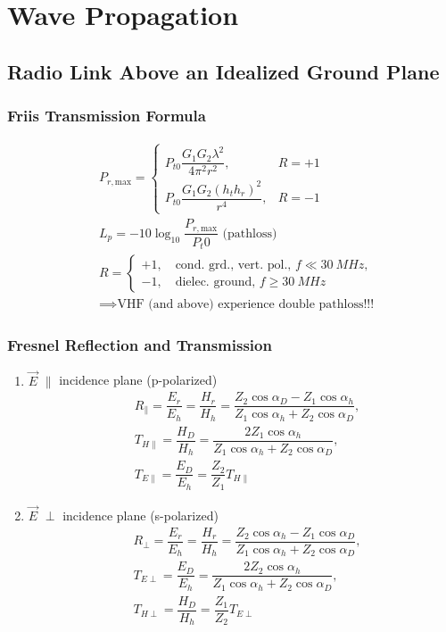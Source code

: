 \section{Wave Propagation}
\subsection{Radio Link Above an Idealized Ground Plane}
\subsubsection{Friis Transmission Formula}

\begin{align*}
    &P_{r,\mathrm{max}} =
    \begin{cases}
        P_{t0}\dfrac{G_1 G_2 \lambda^2}{4\pi^2r^2}, &R=+1\\
        P_{t0}\dfrac{G_1 G_2 (h_t h_r)^2}{r^4}, &R=-1
    \end{cases}\\
    &L_p = -10 \log_{10}\dfrac{P_{r,\mathrm{max}}}{P_t0}\text{ (pathloss)}\\
    &R =
    \begin{cases}
        +1, \quad \text{cond. grd., vert. pol., } f \ll \SI{30}{MHz},\\
        -1, \quad \text{dielec. ground, } f\geq \SI{30}{MHz}
    \end{cases}\\
    &\implies\text{VHF (and above) experience double pathloss!!!}
\end{align*}
\subsubsection{Fresnel Reflection and Transmission}

\begin{enumerate}
    \itemsep0pt
    \item $\vec{E}$ $\parallel$ incidence plane (p-polarized)
        \begin{align*}
            &R_\parallel = \dfrac{E_r}{E_h} = \dfrac{H_r}{H_h} = \dfrac{Z_2\cos\alpha_D - Z_1\cos\alpha_h}{Z_1\cos\alpha_h + Z_2\cos\alpha_D},\\
            &T_{H\parallel} = \dfrac{H_D}{H_h} = \dfrac{2Z_1\cos\alpha_h}{Z_1\cos\alpha_h + Z_2\cos\alpha_D},\\
            &T_{E\parallel} = \dfrac{E_D}{E_h} = \dfrac{Z_2}{Z_1} T_{H\parallel}
        \end{align*}
    \item $\vec{E}$ $\perp$ incidence plane (s-polarized)
        \begin{align*}
            &R_\perp = \dfrac{E_r}{E_h} = \dfrac{H_r}{H_h} = \dfrac{Z_2\cos\alpha_h - Z_1\cos\alpha_D}{Z_1\cos\alpha_h + Z_2\cos\alpha_D},\\
            &T_{E\perp} = \dfrac{E_D}{E_h} = \dfrac{2Z_2\cos\alpha_h}{Z_1\cos\alpha_h + Z_2\cos\alpha_D},\\
            &T_{H\perp} = \dfrac{H_D}{H_h} = \dfrac{Z_1}{Z_2} T_{E\perp}
        \end{align*}
\end{enumerate}

